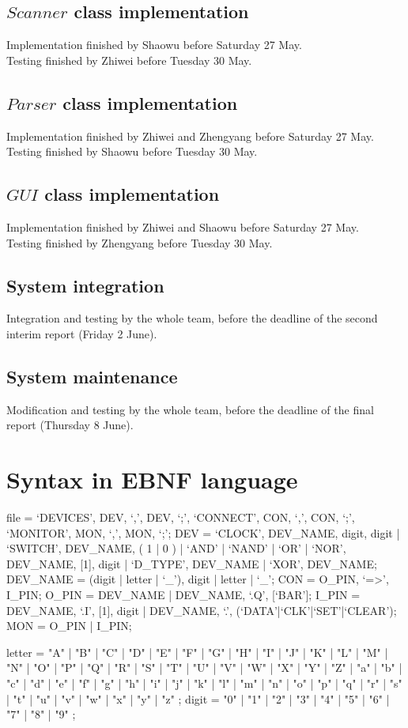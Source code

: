 \documentclass[12pt]{article}
\newenvironment{metaverbatim}{\verbatim}{\endverbatim}
\begin{document}
\subsection{$Scanner$ class implementation}
Implementation finished by Shaowu before Saturday 27 May.\\
Testing finished by Zhiwei before Tuesday 30 May.

\subsection{$Parser$ class implementation}
Implementation finished by Zhiwei and Zhengyang before Saturday 27 May.\\
Testing finished by Shaowu before Tuesday 30 May.

\subsection{$GUI$ class implementation}
Implementation finished by Zhiwei and Shaowu before Saturday 27 May.\\
Testing finished by Zhengyang before Tuesday 30 May.

\subsection{System integration}
Integration and testing by the whole team, before the deadline of the second interim report (Friday 2 June).

\subsection{System maintenance}
Modification and testing by the whole team, before the deadline of the final report (Thursday 8 June).

\newpage
\section{Syntax in EBNF language}
\begin{metaverbatim}
file =  `DEVICES', DEV, {`,', DEV}, `;', `CONNECT', CON, {`,', CON}, `;',
        `MONITOR', MON, {`,', MON}, `;';
DEV  =  `CLOCK', DEV_NAME, digit, {digit} |
        `SWITCH', DEV_NAME, ( 1 | 0 ) |
        `AND' | `NAND' | `OR' | `NOR', DEV_NAME, [1], digit	|
        `D_TYPE', DEV_NAME |
        `XOR', DEV_NAME;
DEV_NAME  =	 (digit | letter | `_'), {digit | letter | `_'};
CON       =  O_PIN, `=>', I_PIN;
O_PIN     =  DEV_NAME |
             DEV_NAME, `.Q', [`BAR'];
I_PIN     =  DEV_NAME, `.I', [1], digit	|
             DEV_NAME, `.', (`DATA'|`CLK'|`SET'|`CLEAR');
MON       =  O_PIN | I_PIN;

letter = "A" | "B" | "C" | "D" | "E" | "F" | "G"
       | "H" | "I" | "J" | "K" | "L" | "M" | "N"
       | "O" | "P" | "Q" | "R" | "S" | "T" | "U"
       | "V" | "W" | "X" | "Y" | "Z" | "a" | "b"
       | "c" | "d" | "e" | "f" | "g" | "h" | "i"
       | "j" | "k" | "l" | "m" | "n" | "o" | "p"
       | "q" | "r" | "s" | "t" | "u" | "v" | "w"
       | "x" | "y" | "z" ;
digit = "0" | "1" | "2" | "3" | "4" | "5" | "6" | "7" | "8" | "9" ;

\end{metaverbatim}
\end{document}
